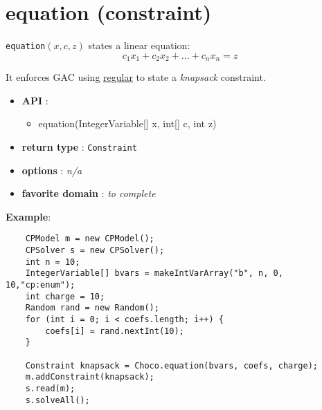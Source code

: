 \label{equation}
\hypertarget{equation}{}

\section{equation (constraint)}\label{equation:equationconstraint}\hypertarget{equation:equationconstraint}{}
\begin{notedef}
  \texttt{equation}$(x,c,z)$ states a linear equation:
$$c_1x_1+c_2x_2+...+c_nx_n = z$$
\end{notedef}
It enforces GAC using \hyperlink{regular:regularconstraint}{regular} to state a \emph{knapsack} constraint.

\begin{itemize}
	\item \textbf{API} :
	\begin{itemize}
		\item equation(IntegerVariable[] x, int[] c, int z)
	\end{itemize}
	\item \textbf{return type} : \texttt{Constraint}
	\item \textbf{options} : \emph{n/a}
	\item \textbf{favorite domain} : \emph{to complete}
\end{itemize}

\textbf{Example}:
\begin{lstlisting}
	CPModel m = new CPModel();                                 
	CPSolver s = new CPSolver();                               
	int n = 10;                                                
	IntegerVariable[] bvars = makeIntVarArray("b", n, 0, 10,"cp:enum");  
	int charge = 10;                                           
	Random rand = new Random();                            
	for (int i = 0; i < coefs.length; i++) {                   
	    coefs[i] = rand.nextInt(10);                           
	}                                                          
	                                                           
	Constraint knapsack = Choco.equation(bvars, coefs, charge);
	m.addConstraint(knapsack);                                 
	s.read(m);                                                 
	s.solveAll();
\end{lstlisting}
